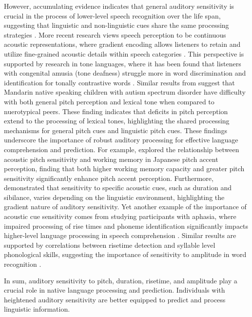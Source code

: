 However, accumulating evidence indicates that general auditory sensitivity is crucial in the process of lower-level speech recognition over the life span, suggesting that linguistic and non-linguistic cues share the same processing strategies \cite{nan_2010, goss_2014}. More recent research views speech perception to be continuous acoustic representations, where gradient encoding allows listeners to retain and utilize fine-grained acoustic details within speech categories \cite{massaro_cohen_1983, mcmurray_2002, toscano_lansing_2019, mcmurray_2008, nygaard_1994, goldinger_1998}. This perspective is supported by research in tone languages, where it has been found that listeners with congenital amusia (tone deafness) struggle more in word discrimination and identification for tonally contrastive words \citep{nan_2010}. Similar results from \cite{Liu2018} suggest that Mandarin native speaking children with autism spectrum disorder have difficulty with both general pitch perception and lexical tone when compared to nuerotypical peers. These finding indicates that deficits in pitch perception extend to the processing of lexical tones, highlighting the shared processing mechanisms for general pitch cues and linguistic pitch cues. These findings underscore the importance of robust auditory processing for effective language comprehension and prediction. For example, \cite{goss_2014} explored the relationship between acoustic pitch sensitivity and working memory in Japanese pitch accent perception, finding that both higher working memory capacity and greater pitch sensitivity significantly enhance pitch accent perception. Furthermore, \cite{Pajak_2014} demonstrated that sensitivity to specific acoustic cues, such as duration and sibilance, varies depending on the linguistic environment, highlighting the gradient nature of auditory sensitivity. Yet another example of the importance of acoustic cue sensitivity comes from studying participants with aphasia, where impaired processing of rise times and phoneme identification significantly impacts higher-level language processing in speech comprehension \citep{Kries2023}. Similar results are supported by correlations between risetime detection and syllable level phonological skills, suggesting the importance of sensitivity to amplitude in word recognition \citep{Hamalaine2005}. 

In sum, auditory sensitivity to pitch, duration, risetime, and amplitude play a crucial role in native language processing and prediction. Individuals with heightened auditory sensitivity are better equipped to predict and process linguistic information.

